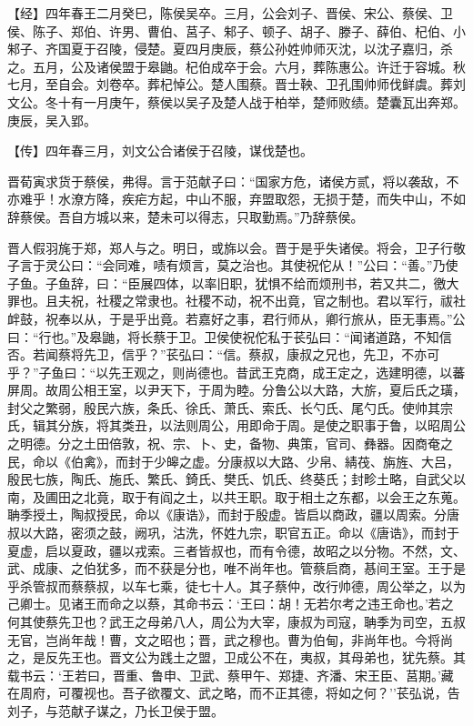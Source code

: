 \documentclass[]{article}
\begin{document}
【经】四年春王二月癸巳，陈侯吴卒。三月，公会刘子、晋侯、宋公、蔡侯、卫侯、陈子、郑伯、许男、曹伯、莒子、邾子、顿子、胡子、滕子、薛伯、杞伯、小邾子、齐国夏于召陵，侵楚。夏四月庚辰，蔡公孙姓帅师灭沈，以沈子嘉归，杀之。五月，公及诸侯盟于皋鼬。杞伯成卒于会。六月，葬陈惠公。许迁于容城。秋七月，至自会。刘卷卒。葬杞悼公。楚人围蔡。晋士鞅、卫孔围帅师伐鲜虞。葬刘文公。冬十有一月庚午，蔡侯以吴子及楚人战于柏举，楚师败绩。楚囊瓦出奔郑。庚辰，吴入郢。

【传】四年春三月，刘文公合诸侯于召陵，谋伐楚也。

晋荀寅求货于蔡侯，弗得。言于范献子曰：``国家方危，诸侯方贰，将以袭敌，不亦难乎！水潦方降，疾疟方起，中山不服，弃盟取怨，无损于楚，而失中山，不如辞蔡侯。吾自方城以来，楚未可以得志，只取勤焉。''乃辞蔡侯。

晋人假羽旄于郑，郑人与之。明日，或旆以会。晋于是乎失诸侯。将会，卫子行敬子言于灵公曰：``会同难，啧有烦言，莫之治也。其使祝佗从！''公曰：``善。''乃使子鱼。子鱼辞，曰：``臣展四体，以率旧职，犹惧不给而烦刑书，若又共二，徼大罪也。且夫祝，社稷之常隶也。社稷不动，祝不出竟，官之制也。君以军行，祓社衅鼓，祝奉以从，于是乎出竟。若嘉好之事，君行师从，卿行旅从，臣无事焉。''公曰：``行也。''及皋鼬，将长蔡于卫。卫侯使祝佗私于苌弘曰：``闻诸道路，不知信否。若闻蔡将先卫，信乎？''苌弘曰：``信。蔡叔，康叔之兄也，先卫，不亦可乎？''子鱼曰：``以先王观之，则尚德也。昔武王克商，成王定之，选建明德，以蕃屏周。故周公相王室，以尹天下，于周为睦。分鲁公以大路，大旂，夏后氏之璜，封父之繁弱，殷民六族，条氏、徐氏、萧氏、索氏、长勺氏、尾勺氏。使帅其宗氏，辑其分族，将其类丑，以法则周公，用即命于周。是使之职事于鲁，以昭周公之明德。分之土田倍敦，祝、宗、卜、史，备物、典策，官司、彝器。因商奄之民，命以《伯禽》，而封于少皞之虚。分康叔以大路、少帛、綪茷、旃旌、大吕，殷民七族，陶氏、施氏、繁氏、錡氏、樊氏、饥氏、终葵氏；封畛土略，自武父以南，及圃田之北竟，取于有阎之土，以共王职。取于相土之东都，以会王之东蒐。聃季授土，陶叔授民，命以《康诰》，而封于殷虚。皆启以商政，疆以周索。分唐叔以大路，密须之鼓，阙巩，沽洗，怀姓九宗，职官五正。命以《唐诰》，而封于夏虚，启以夏政，疆以戎索。三者皆叔也，而有令德，故昭之以分物。不然，文、武、成康、之伯犹多，而不获是分也，唯不尚年也。管蔡启商，惎间王室。王于是乎杀管叔而蔡蔡叔，以车七乘，徒七十人。其子蔡仲，改行帅德，周公举之，以为己卿士。见诸王而命之以蔡，其命书云：`王曰：胡！无若尔考之违王命也。'若之何其使蔡先卫也？武王之母弟八人，周公为大宰，康叔为司寇，聃季为司空，五叔无官，岂尚年哉！曹，文之昭也；晋，武之穆也。曹为伯甸，非尚年也。今将尚之，是反先王也。晋文公为践土之盟，卫成公不在，夷叔，其母弟也，犹先蔡。其载书云：`王若曰，晋重、鲁申、卫武、蔡甲午、郑捷、齐潘、宋王臣、莒期。'藏在周府，可覆视也。吾子欲覆文、武之略，而不正其德，将如之何？''苌弘说，告刘子，与范献子谋之，乃长卫侯于盟。
\end{document}
